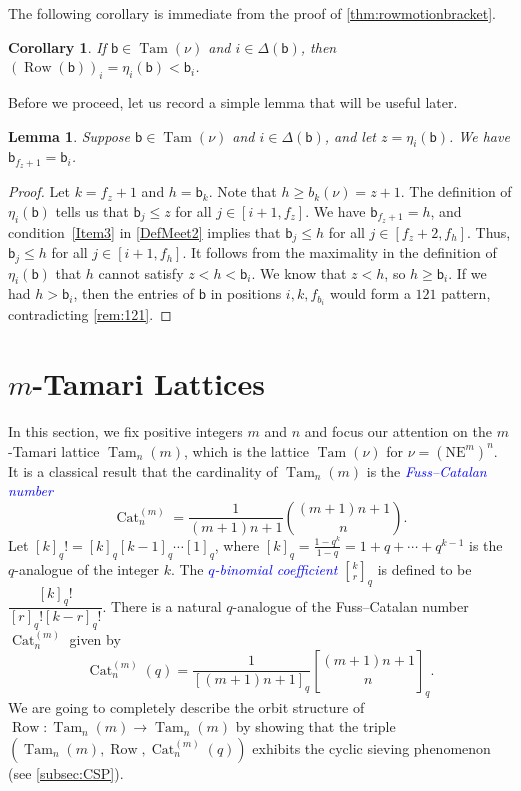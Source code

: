 \documentclass[11pt]{amsart}
\newtheorem{corollary}[theorem]{Corollary}
\newtheorem{lemma}[theorem]{Lemma}
\theoremstyle{definition}
\DeclareMathOperator{\Tam}{Tam}
\DeclareMathOperator{\row}{Row}
\DeclareMathOperator{\Cat}{Cat}
\newcommand{\dfn}[1]{\textcolor{blue}{\emph{#1}}}
\begin{document}
The following corollary is immediate from the proof of \cref{thm:rowmotionbracket}. 

\begin{corollary}\label{cor:delta}
If $\mathsf b\in\Tam(\nu)$ and $i\in\Delta(\mathsf b)$, then $(\row(\mathsf b))_i=\eta_i(\mathsf b)<\mathsf b_i$. 
\end{corollary}

Before we proceed, let us record a simple lemma that will be useful later. 

\begin{lemma}\label{lem:etazthing}
Suppose $\mathsf b\in\Tam(\nu)$ and $i\in\Delta(\mathsf b)$, and let $z=\eta_i(\mathsf b)$. We have $\mathsf b_{f_{z}+1}=\mathsf b_i$. 
\end{lemma}

\begin{proof}
Let $k=f_z+1$ and $h=\mathsf b_k$. Note that $h\geq b_k(\nu)=z+1$. The definition of $\eta_i(\mathsf b)$ tells us that $\mathsf b_j\leq z$ for all $j\in[i+1,f_z]$. We have $\mathsf b_{f_z+1}=h$, and condition~\eqref{Item3} in \cref{DefMeet2} implies that $\mathsf b_j\leq h$ for all $j\in[f_z+2,f_h]$. Thus, $\mathsf b_j\leq h$ for all $j\in[i+1,f_{h}]$. It follows from the maximality in the definition of $\eta_i(\mathsf b)$ that $h$ cannot satisfy $z<h<\mathsf b_i$. We know that $z<h$, so $h\geq\mathsf b_i$. If we had $h>\mathsf b_i$, then the entries of $\mathsf b$ in positions $i,k,f_{b_i}$ would form a $121$ pattern, contradicting \cref{rem:121}. 
\end{proof}

\section{$m$-Tamari Lattices}\label{Sec:mTamari}

In this section, we fix positive integers $m$ and $n$ and focus our attention on the $m$-Tamari lattice $\Tam_n(m)$, which is the lattice $\Tam(\nu)$ for $\nu=(\text{N}\text{E}^m)^n$. It is a classical result \cite{Dvoretzky} that the cardinality of $\Tam_n(m)$ is the \dfn{Fuss--Catalan number} \[\Cat^{(m)}_n=\frac{1}{(m+1)n+1}\binom{(m+1)n+1}{n}.\] Let ${[k]_q!=[k]_q[k-1]_q\cdots[1]_q}$, where $[k]_q=\frac{1-q^k}{1-q}=1+q+\cdots+q^{k-1}$ is the $q$-analogue of the integer $k$. The \dfn{$q$-binomial coefficient} ${k\brack r}_q$ is defined to be $\dfrac{[k]_q!}{[r]_q![k-r]_q!}$. There is a natural $q$-analogue of the Fuss--Catalan number $\Cat_n^{(m)}$ given by \[\Cat^{(m)}_n(q)=\frac{1}{[(m+1)n+1]_q}{(m+1)n+1\brack n}_q.\] We are going to completely describe the orbit structure of $\row\colon\Tam_n(m)\to\Tam_n(m)$ by showing that the triple $(\Tam_n(m),\row,\Cat_n^{(m)}(q))$ exhibits the cyclic sieving phenomenon (see \cref{subsec:CSP}). 
\end{document}
